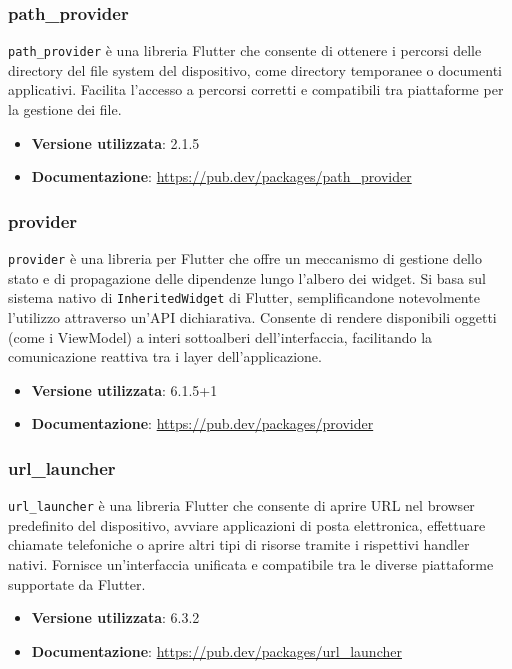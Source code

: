 \documentclass[a4paper,12pt]{article}
\begin{document}
\subsubsection{path\_provider}
\texttt{path\_provider} è una libreria Flutter che consente di ottenere i percorsi delle directory del file system del dispositivo, come directory temporanee o documenti applicativi. Facilita l'accesso a percorsi corretti e compatibili tra piattaforme per la gestione dei file.
\begin{itemize}
    \item \textbf{Versione utilizzata}: 2.1.5
    \item \textbf{Documentazione}: \url{https://pub.dev/packages/path_provider}
\end{itemize}

\subsubsection{provider}
\texttt{provider} è una libreria per Flutter che offre un meccanismo di gestione dello stato e di propagazione delle dipendenze lungo l'albero dei widget. Si basa sul sistema nativo di \texttt{InheritedWidget} di Flutter, semplificandone notevolmente l'utilizzo attraverso un'API dichiarativa. Consente di rendere disponibili oggetti (come i ViewModel) a interi sottoalberi dell'interfaccia, facilitando la comunicazione reattiva tra i layer dell'applicazione.
\begin{itemize}
    \item \textbf{Versione utilizzata}: 6.1.5+1
    \item \textbf{Documentazione}: \url{https://pub.dev/packages/provider}
\end{itemize}

\subsubsection{url\_launcher}
\texttt{url\_launcher} è una libreria Flutter che consente di aprire URL nel browser predefinito del dispositivo, avviare applicazioni di posta elettronica, effettuare chiamate telefoniche o aprire altri tipi di risorse tramite i rispettivi handler nativi. Fornisce un'interfaccia unificata e compatibile tra le diverse piattaforme supportate da Flutter.
\begin{itemize}
    \item \textbf{Versione utilizzata}: 6.3.2
    \item \textbf{Documentazione}: \url{https://pub.dev/packages/url_launcher}
\end{itemize}
\end{document}
